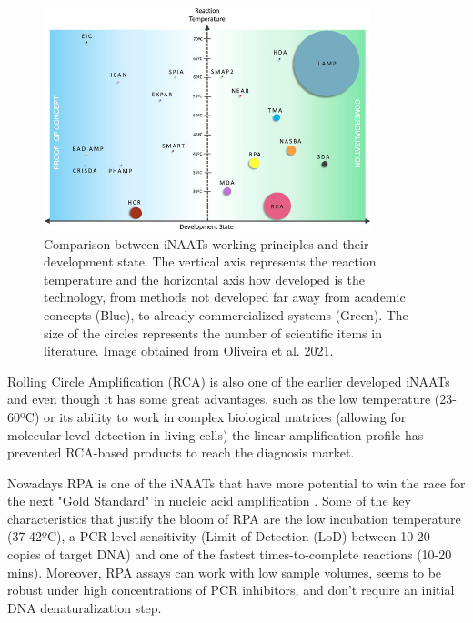 \begin{figure}[b]
    \centering
    \includegraphics[width=0.85\textwidth]{figures/commercial kits.jpg}
    \caption[Comparison between iNAATs working principles and their development state.]{Comparison between iNAATs working principles and their development state. The vertical axis represents the reaction temperature and the horizontal axis how developed is the technology, from methods not developed far away from academic concepts (Blue), to already commercialized systems (Green). The size of the circles represents the number of scientific items in literature. Image obtained from Oliveira et al. 2021\cite{oliveira_isothermal_2021}.}
    \label{fig:development state}
\end{figure}

Rolling Circle Amplification (RCA) is also one of the earlier developed iNAATs \cite{fire_rolling_1995} and even though it has some great advantages, such as the low temperature (23-60ºC) or its ability to work in complex biological matrices (allowing for molecular-level detection in living cells\cite{konry_ultrasensitive_2011}) the linear amplification profile has prevented RCA-based products to reach the diagnosis market.

Nowadays RPA is one of the iNAATs that have more potential to win the race for the next "Gold Standard" in nucleic acid amplification \cite{oliveira_isothermal_2021}. Some of the key characteristics that justify the bloom of RPA are the low incubation temperature (37-42ºC), a PCR level sensitivity (Limit of Detection (LoD) between 10-20 copies of target DNA) and one of the fastest times-to-complete reactions (10-20 mins)\cite{kunze_-chip_2016}. Moreover, RPA assays can work with low sample volumes, seems to be robust under high concentrations of PCR inhibitors, and don't require an initial DNA denaturalization step\cite{twist_dx_recombinase_2017}\cite{kersting_rapid_2014}\cite{deng_bioanalytical_2015-1}.

